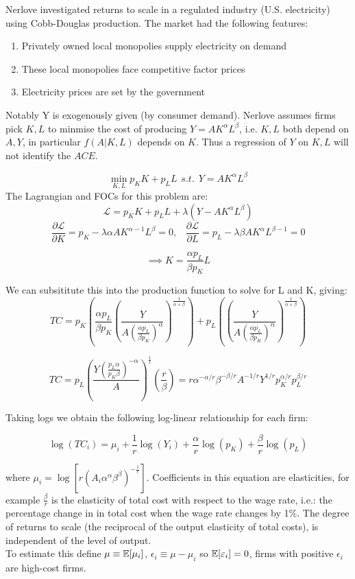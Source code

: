 \documentclass[DIV=14,titlepage=false]{scrreprt}
\begin{document}
\begin{example}
Nerlove investigated returns to scale in a regulated industry (U.S. electricity) using Cobb-Douglas production. The market had the following features:
\begin{enumerate}
    \item Privately owned local monopolies supply electricity on demand 
    \item These local monopolies face competitive factor prices
    \item Electricity prices are set by the government
\end{enumerate}
Notably Y is exogenously given (by consumer demand). Nerlove assumes firms pick $K,L$ to minmise the cost of producing $Y=AK^{\alpha}L^{\beta}$, i.e. $K,L$ both depend on $A,Y$, in particular $f(A|K,L)$ depends on $K$. Thus a regression of $Y$ on $K,L$ will not identify the $ACE$.

\[ \min_{K, L} p_K K + p_L L \hspace{5pt} s.t. \hspace{5pt} Y=AK^{\alpha}L^{\beta}\]
The Lagrangian and FOCs for this problem are:
\[ \mathcal{L} = p_K K + p_L L + \lambda(Y - AK^\alpha L^\beta) \]
\[ \frac{\partial \mathcal{L}}{\partial K} = p_K - \lambda \alpha AK^{\alpha-1}L^\beta = 0 , \hspace{10pt} \frac{\partial \mathcal{L}}{\partial L} = p_L - \lambda \beta AK^\alpha L^{\beta-1} = 0 \]

\[ \implies K = \frac{\alpha p_L}{\beta p_K} L \]

We can subsititute this into the production function to solve for L and K, giving:
\[ TC = p_K \left(\frac{\alpha p_L}{\beta p_K} \left(\frac{Y}{A\left(\frac{\alpha p_L}{\beta p_K}\right)^\alpha}\right)^{\frac{1}{\alpha + \beta}}\right) + p_L \left(\left(\frac{Y}{A\left(\frac{\alpha p_L}{\beta p_K}\right)^\alpha}\right)^{\frac{1}{\alpha + \beta}}\right) \]

\[ TC = p_L \left( \frac{Y \left(\frac{p_L \alpha}{p_K \beta}\right)^{-\alpha}}{A} \right)^{\frac{1}{r}} \left( \frac{r}{\beta} \right)  = r \alpha^{-\alpha/r} \beta^{-\beta/r} A^{-1/r} Y^{1/r} p_K^{\alpha/r} p_L^{\beta/r} \]

Taking logs we obtain the following log-linear relationship for each firm:

\[ \log(TC_i)=\mu_i + \frac{1}{r}\log(Y_i)+\frac{\alpha}{r}\log(p_K)+\frac{\beta}{r}\log(p_L)\]

where $\mu_i = \log[r(A_i {\alpha}^{\alpha} {\beta}^{\beta})^{-\frac{1}{r}}]$. Coefficients in this equation are elasticities, for example $\frac{\beta}{r}$ is the elasticity of total cost with respect to the wage rate, i.e.: the percentage change in in total cost when the wage rate changes by 1\%. The degree of returns to scale (the reciprocal of the output elasticity of total costs), is independent of the level of output.\\
To estimate this define $\mu \equiv \mathbb{E}[\mu_i]$, $\epsilon_i \equiv \mu - \mu_i$ so $\mathbb{E}[\varepsilon_i]=0$, firms with positive $\epsilon_i$ are high-cost firms.


\end{example}
\end{document}
